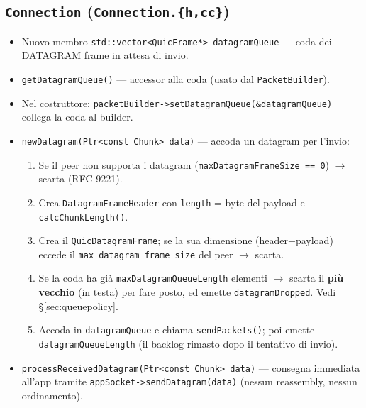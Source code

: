 \documentclass[11pt,a4paper]{article}
\newcommand{\code}[1]{\texttt{#1}}
\begin{document}
\subsection{\code{Connection} (\code{Connection.\{h,cc\}})}
\begin{itemize}[nosep,leftmargin=1.4em]
  \item Nuovo membro \code{std::vector<QuicFrame*> datagramQueue} --- coda dei DATAGRAM frame in attesa di invio.
  \item \code{getDatagramQueue()} --- accessor alla coda (usato dal \code{PacketBuilder}).
  \item Nel costruttore: \code{packetBuilder->setDatagramQueue(\&datagramQueue)} collega la coda al builder.
  \item \code{newDatagram(Ptr<const Chunk> data)} --- accoda un datagram per l'invio:
    \begin{enumerate}[nosep,label=\arabic*.]
      \item Se il peer non supporta i datagram (\code{maxDatagramFrameSize == 0}) $\to$ scarta (RFC 9221).
      \item Crea \code{DatagramFrameHeader} con \code{length} = byte del payload e \code{calcChunkLength()}.
      \item Crea il \code{QuicDatagramFrame}; se la sua dimensione (header+payload) eccede il
        \code{max\_datagram\_frame\_size} del peer $\to$ scarta.
      \item Se la coda ha gi\`a \code{maxDatagramQueueLength} elementi $\to$ scarta il \textbf{pi\`u
        vecchio} (in testa) per fare posto, ed emette \code{datagramDropped}. Vedi
        \S\ref{sec:queuepolicy}.
      \item Accoda in \code{datagramQueue} e chiama \code{sendPackets()}; poi emette
        \code{datagramQueueLength} (il backlog rimasto dopo il tentativo di invio).
    \end{enumerate}
  \item \code{processReceivedDatagram(Ptr<const Chunk> data)} --- consegna immediata all'app tramite
    \code{appSocket->sendDatagram(data)} (nessun reassembly, nessun ordinamento).
\end{itemize}
\end{document}
